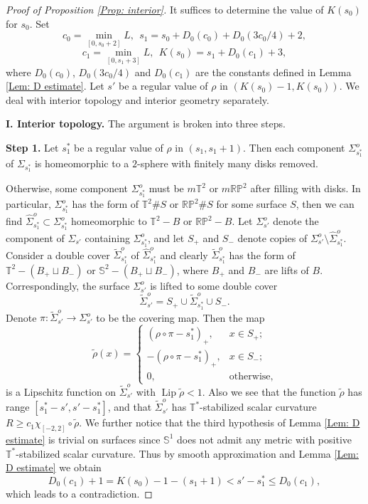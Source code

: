\documentclass[10pt,a4paper]{amsart}
\DeclareMathOperator{\Lip}{Lip}
\begin{document}
\begin{proof}[Proof of Proposition \ref{Prop: interior}]
It suffices to determine the value of $K(s_{0})$ for $s_{0}$. Set
\[
c_{0} = \min_{[0,s_{0}+2]}L,\ \
s_{1} = s_{0}+D_{0}(c_{0})+D_{0}(3c_{0}/4)+2,
\]
\[
c_1=\min_{[0,s_{1}+3]}L,\ \ K(s_{0})=s_1+D_0(c_1)+3,
\]
where $D_0(c_0)$, $D_0(3c_0/4)$ and $D_0(c_1)$ are the constants defined in Lemma \ref{Lem: D estimate}.
Let $s'$ be a regular value of $\rho$ in $(K(s_0)-1,K(s_0))$.
We deal with interior topology and interior geometry separately.


\bigskip

\noindent
{\bf I. Interior topology.}
The argument is broken into three steps.

\medskip

\noindent
{\bf Step 1.} Let $s_{1}^{*}$ be a regular value of $\rho$ in $(s_{1},s_{1}+1)$. Then each component $\Sigma_{s_1^*}^o$ of $\Sigma_{s_1^*}$ is homeomorphic to a $2$-sphere with finitely many disks removed.

\medskip

Otherwise, some component $\Sigma_{s_1^*}^o$ must be $m\mathbb{T}^{2}$ or $m\mathbb{RP}^{2}$ after filling with disks. In particular, $\Sigma_{s_1^*}^o$ has the form of $\mathbb{T}^2\#S$ or $\mathbb{RP}^2\#S$ for some surface $S$, then we can find $\hat \Sigma^o_{s_1^*}\subset \Sigma_{s_1^*}^o$ homeomorphic to $\mathbb T^2-B$ or $\mathbb{RP}^{2}-B$.
Let $\Sigma_{s'}^o$ denote the component of $\Sigma_{s'}$ containing $\Sigma_{s_1^*}^o$, and let $S_+$ and $S_-$ denote copies of $\Sigma_{s'}^o\setminus \hat\Sigma_{s_1^*}^o$. Consider a double cover $\tilde\Sigma_{s_1^*}^o$ of $\hat\Sigma_{s_1^*}^o$ and clearly $\tilde\Sigma_{s_1^*}^o$ has the form of $\mathbb T^2-(B_+\sqcup B_-)$ or $\mathbb S^2-(B_+\sqcup B_-)$, where $B_+$ and $B_-$ are lifts of $B$. Correspondingly, the surface $\Sigma_{s'}^o$ is lifted to some double cover
\[
\tilde\Sigma_{s'}^o=S_+\cup \tilde\Sigma_{s_1^*}^o \cup S_-.
\]
Denote $\pi:\tilde\Sigma_{s'}^o\to \Sigma_{s'}^o$ to be the covering map. Then the map
\begin{equation*}
\tilde \rho(x)=\left\{
\begin{array}{cc}
(\rho\circ \pi-s_1^*)_+,& x\in S_+;\\[1mm]
-(\rho\circ \pi-s_1^*)_+,& x\in S_-;\\[1mm]
0,&\mbox{otherwise},
\end{array}\right.
\end{equation*}
is a Lipschitz function on $\tilde\Sigma_{s'}^o$ with $\Lip \tilde \rho<1$. Also we see that the function $\tilde \rho $ has range $[s_1^*-s',s'-s_1^*]$, and that $\tilde \Sigma_{s'}^o$ has $\mathbb{T}^*$-stabilized scalar curvature $R\geq c_1\chi_{[-2,2]}\circ\tilde \rho$. We further notice that the third hypothesis of Lemma \ref{Lem: D estimate} is trivial on surfaces since $\mathbb{S}^1$ does not admit any metric with positive $\mathbb{T}^{*}$-stabilized scalar curvature. Thus by smooth approximation and Lemma \ref{Lem: D estimate} we obtain
$$
D_0(c_1)+1 = K(s_{0})-1-(s_{1}+1) < s'-s_1^*\leq D_0(c_1),
$$
which leads to a contradiction.



\end{proof}
\end{document}
